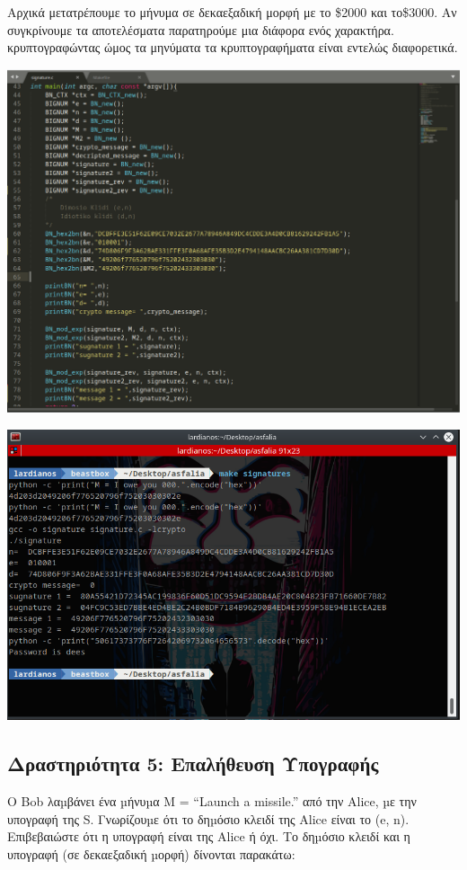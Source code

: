 \noindent
Αρχικά μετατρέπουμε το μήνυμα σε δεκαεξαδική μορφή με το \$2000 και το\$3000. Αν συγκρίνουμε τα αποτελέσματα
παρατηρούμε μια διάφορα ενός χαρακτήρα. κρυπτογραφώντας ώμος τα μηνύματα τα κρυπτογραφήματα είναι εντελώς
διαφορετικά.
\begin{center}
			\includegraphics[width=1\textwidth]{image/image34code.PNG}		
\end{center}
\begin{center}
			\includegraphics[width=1\textwidth]{image/image34term.PNG}		
\end{center}

\subsection{Δραστηριότητα 5: Επαλήθευση Υπογραφής}
\noindent
Ο Bob λαµβάνει ένα µήνυµα Μ = “Launch a missile.” από την Alice, µε την υπογραφή της S.
Γνωρίζουµε ότι το δηµόσιο κλειδί της Alice είναι το (e, n). Επιβεβαιώστε ότι η υπογραφή είναι
της Alice ή όχι. Το δηµόσιο κλειδί και η υπογραφή (σε δεκαεξαδική µορφή) δίνονται παρακάτω:


